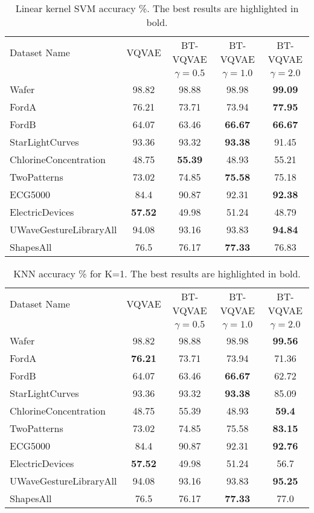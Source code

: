 \documentclass[../../thesis.tex]{subfiles}
\begin{document}
\begin{table}
    \centering
    \begin{tabular}{l c c c c}
    \toprule
    Dataset Name & VQVAE & BT-VQVAE & BT-VQVAE & BT-VQVAE \\
    & & $\gamma = 0.5$ & $\gamma = 1.0$ & $\gamma = 2.0$ \\
    \midrule
    Wafer & 98.82 & 98.88 & 98.98 & \textbf{99.09} \\
    FordA & 76.21 & 73.71 & 73.94 & \textbf{77.95} \\
    FordB & 64.07 & 63.46 & \textbf{66.67} & \textbf{66.67} \\
    StarLightCurves & 93.36 & 93.32 & \textbf{93.38} & 91.45 \\
    ChlorineConcentration & 48.75 & \textbf{55.39} & 48.93 & 55.21 \\
    TwoPatterns & 73.02 & 74.85 & \textbf{75.58} & 75.18 \\
    ECG5000 & 84.4 & 90.87 & 92.31 & \textbf{92.38} \\
    ElectricDevices & \textbf{57.52} & 49.98 & 51.24 & 48.79 \\
    UWaveGestureLibraryAll & 94.08 & 93.16 & 93.83 & \textbf{94.84} \\
    ShapesAll & 76.5 & 76.17 & \textbf{77.33} & 76.83 \\
    \bottomrule
    \end{tabular}
    \caption{Linear kernel SVM accuracy \%. The best results are highlighted in bold.}
    \label{tab:svm_acc}
\end{table}



\begin{table}
    \centering
    \begin{tabular}{l c c c c}
    \toprule
    Dataset Name & VQVAE & BT-VQVAE & BT-VQVAE & BT-VQVAE \\
    & & $\gamma = 0.5$ & $\gamma = 1.0$ & $\gamma = 2.0$ \\
    \midrule
    Wafer & 98.82 & 98.88 & 98.98 & \textbf{99.56} \\
    FordA & \textbf{76.21} & 73.71 & 73.94 & 71.36 \\
    FordB & 64.07 & 63.46 & \textbf{66.67} & 62.72 \\
    StarLightCurves & 93.36 & 93.32 & \textbf{93.38} & 85.09 \\
    ChlorineConcentration & 48.75 & 55.39 & 48.93 & \textbf{59.4} \\
    TwoPatterns & 73.02 & 74.85 & 75.58 & \textbf{83.15} \\
    ECG5000 & 84.4 & 90.87 & 92.31 & \textbf{92.76} \\
    ElectricDevices & \textbf{57.52} & 49.98 & 51.24 & 56.7 \\
    UWaveGestureLibraryAll & 94.08 & 93.16 & 93.83 & \textbf{95.25} \\
    ShapesAll & 76.5 & 76.17 & \textbf{77.33} & 77.0 \\
    \bottomrule
    \end{tabular}
    \caption{KNN accuracy \% for K=1. The best results are highlighted in bold.}
    \label{tab:knn1_acc}
\end{table}
\end{document}
